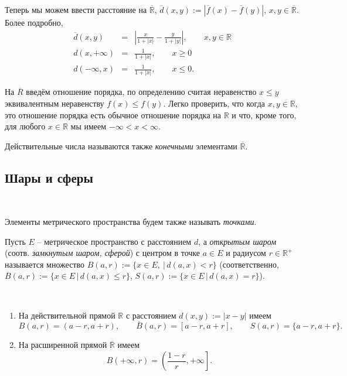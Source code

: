 Теперь мы можем ввести расстояние на $\overline{\mathbb{R}}$, $\overline{d}(x,y):=|\overline{f}(x) - \overline{f}(y)|$, $x,y \in \overline{\mathbb{R}}.$ Более подробно,
\begin{eqnarray*}
    \overline{d}(x,y) &=& \left| \frac{x}{1+|x|} - \frac{y}{1+|y|} \right|, \qquad x,y\in \mathbb{R}\\
    d(x, + \infty) &=& \frac{1}{1+|x|}, \qquad x \ge 0\\
    d(-\infty,x) &=& \frac{1}{1+|x|}, \qquad x \le 0.
\end{eqnarray*}

На $\overline{R}$ введём отношение порядка, по определению считая неравенство $x \le y$ эквивалентным неравенству $f(x) \le f(y)$. Легко проверить, что когда $x,y \in \mathbb{R}$, это отношение порядка есть обычное отношение порядка на $\mathbb{R}$ и что, кроме того, для любого $x\in \mathbb{R}$ мы имеем $- \infty < x < \infty.$

Действительные числа называются также \textit{конечными} элементами $\overline{\mathbb{R}}.$ 


\subsection{Шары и сферы}~

Элементы метрического пространства будем также называть \textit{точками}. 

\begin{definition}
    Пусть $E$ -- метрическое пространство с расстоянием $d$, а \textit{открытым шаром} (соотв. \textit{замкнутым шаром, сферой}) с центром в точке $a \in E$ и радиусом $r \in \mathbb{R}^+$ называется множество $B(a,r):=\{x\in E,\ |\, d(a,x)<r\}$ (соответственно, $\overline{B}(a,r):= \{x\in E\, |\, d(a,x) \le r\}$, $S(a,r):=\{x \in E\, |\, d(a,x) = r \}$).
\end{definition}

\begin{example}~
    \begin{enumerate}
        \item На действительной прямой $\mathbb{R}$ с расстоянием $d(x,y):=|x-y|$ имеем
        \[
         B(a,r) = (a-r, a+r), \qquad \overline{B}(a,r) = [a-r, a+r], \qquad S(a,r) = \{a-r, a+r\}.
        \]
        \item На расширенной прямой $\overline{\mathbb{R}}$ имеем
        \[
         B(+\infty, r) = \left(\frac{1-r}{r}, +\infty \left. \right. \right].
        \]
    \end{enumerate}
\end{example}


